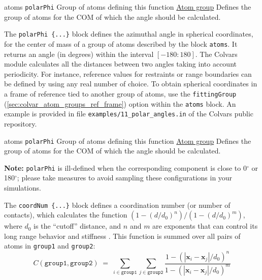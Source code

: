 \begin{cvcoptions}
\item %
  \key
    {atoms}{%
    \texttt{polarPhi}}{%
    Group of atoms defining this function}{%
    \hyperref[sec:colvar_atom_groups]{Atom group}}{%
    Defines the group of atoms for the COM of which the angle should be calculated.
    }
\end{cvcoptions}



The \texttt{polarPhi~\{...\}} block defines the azimuthal angle in
spherical coordinates, for the center of mass of a group of atoms
described by the block \texttt{atoms}. It returns an angle
(in degrees) within the interval $[-180:180]$.  The Colvars module
calculates all the distances between two angles taking into account
periodicity.  For instance, reference values for restraints or range
boundaries can be defined by using any real number of choice.
To obtain spherical coordinates in a frame of reference tied to
another group of atoms, use the \texttt{fittingGroup} (\ref{sec:colvar_atom_groups_ref_frame}) option
within the \texttt{atoms} block.
An example is provided in file \texttt{examples/11\_polar\_angles.in} of the Colvars public repository.


\begin{cvcoptions}
\item %
  \key
    {atoms}{%
    \texttt{polarPhi}}{%
    Group of atoms defining this function}{%
    \hyperref[sec:colvar_atom_groups]{Atom group}}{%
    Defines the group of atoms for the COM of which the angle should be calculated.
    }
\end{cvcoptions}

\textbf{Note:} \texttt{polarPhi} is ill-defined when the corresponding
 component is close to 0$^\circ$ or 180$^\circ$; please take
measures to avoid sampling these configurations in your simulations.





The \texttt{coordNum \{...\}} block defines
a coordination number (or number of contacts), which calculates the
function $(1-(d/d_0)^{n})/(1-(d/d_0)^{m})$, where $d_0$ is the
``cutoff'' distance, and $n$ and $m$ are exponents that can control
its long range behavior and stiffness \cite{Iannuzzi2003}.  This
function is summed over all pairs of atoms in \texttt{group1} and
\texttt{group2}:
\begin{equation}
  \label{eq:cvc_coordNum}
  C (\mathtt{group1}, \mathtt{group2}) \; = \;
  \sum_{i\in\mathtt{group1}}\sum_{j\in\mathtt{group2}} {
    \frac{1 - (|\mathbf{x}_{i}-\mathbf{x}_{j}|/d_{0})^{n}}{
      1 - (|\mathbf{x}_{i}-\mathbf{x}_{j}|/d_{0})^{m} }
  }
\end{equation}

